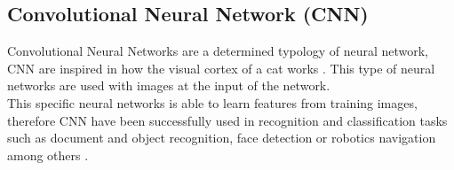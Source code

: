 

\subsection{Convolutional Neural Network (CNN)}
Convolutional Neural Networks are a determined typology of neural network, CNN are inspired in how the visual cortex of a cat works \cite{Doorn}. This type of neural networks are used with images at the input of the network.\\

This specific neural networks is able to learn features from training images, therefore CNN have been successfully used in recognition and classification tasks such as document and object recognition, face detection or robotics navigation among others \cite{Lecum2, Lecum3}.\\
